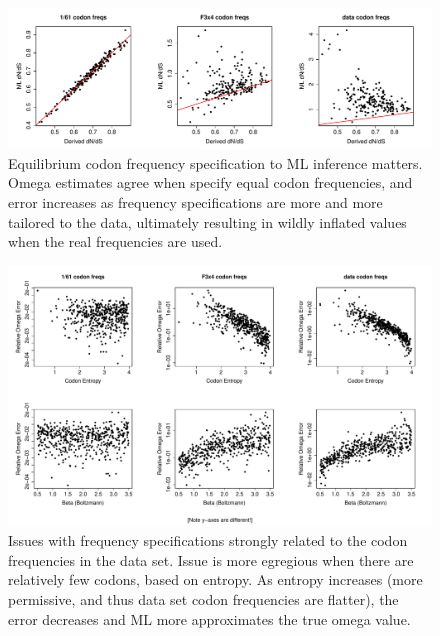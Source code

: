 \documentclass[11pt]{article}
\begin{document}
\begin{figure}[H]
\centerline{\includegraphics[width=6in]{figures/freqspec_1beta.pdf}}
\caption{\label{freqspec_compare} Equilibrium codon frequency specification to ML inference matters. Omega estimates agree when specify equal codon frequencies, and error increases as frequency specifications are more and more tailored to the data, ultimately resulting in wildly inflated values when the real frequencies are used.}
\end{figure}

\begin{figure}[H]
\centerline{\includegraphics[width=6in]{figures/freqspec_beta_s_error.pdf}}
\caption{\label{freq_s_error} Issues with frequency specifications strongly related to the codon frequencies in the data set. Issue is more egregious when there are relatively few codons, based on entropy. As entropy increases (more permissive, and thus data set codon frequencies are flatter), the error decreases and ML more approximates the true omega value.}
\end{figure}
\end{document}
